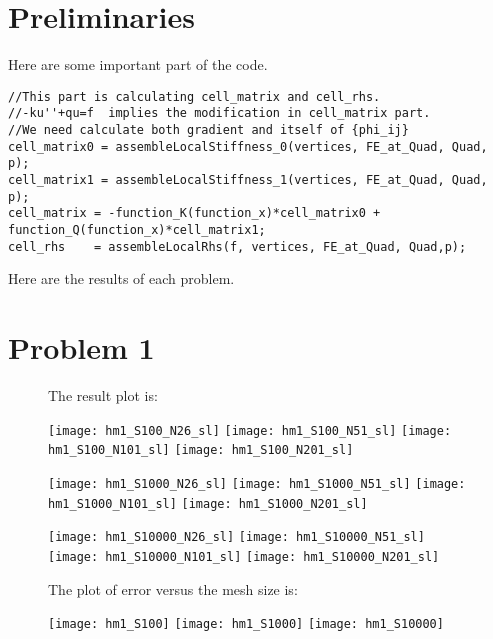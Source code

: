 \documentclass[11pt]{article}
\begin{document}
\section{Preliminaries}
Here are some important part of the code.
\begin{verbatim}
//This part is calculating cell_matrix and cell_rhs.
//-ku''+qu=f  implies the modification in cell_matrix part.
//We need calculate both gradient and itself of {phi_ij}
cell_matrix0 = assembleLocalStiffness_0(vertices, FE_at_Quad, Quad, p);
cell_matrix1 = assembleLocalStiffness_1(vertices, FE_at_Quad, Quad, p);
cell_matrix = -function_K(function_x)*cell_matrix0 + function_Q(function_x)*cell_matrix1;
cell_rhs    = assembleLocalRhs(f, vertices, FE_at_Quad, Quad,p); 
\end{verbatim}
\newpage
Here are the results of each problem.
\section{Problem 1}
\begin{figure}
	The result plot is:\\
	\begin{center}
		\centering
		\texttt{[image: hm1\_S100\_N26\_sl]}
		\texttt{[image: hm1\_S100\_N51\_sl]}
		\texttt{[image: hm1\_S100\_N101\_sl]}
		\texttt{[image: hm1\_S100\_N201\_sl]}
		
		\texttt{[image: hm1\_S1000\_N26\_sl]}
		\texttt{[image: hm1\_S1000\_N51\_sl]}
		\texttt{[image: hm1\_S1000\_N101\_sl]}
		\texttt{[image: hm1\_S1000\_N201\_sl]}
		
		\texttt{[image: hm1\_S10000\_N26\_sl]}
		\texttt{[image: hm1\_S10000\_N51\_sl]}
		\texttt{[image: hm1\_S10000\_N101\_sl]}
		\texttt{[image: hm1\_S10000\_N201\_sl]}		
	\end{center}
	The plot of error versus the mesh size is:\\
	\begin{center}
		\centering
		\texttt{[image: hm1\_S100]}
		\texttt{[image: hm1\_S1000]}
		\texttt{[image: hm1\_S10000]}	
	\end{center}
\end{figure}
\end{document}
